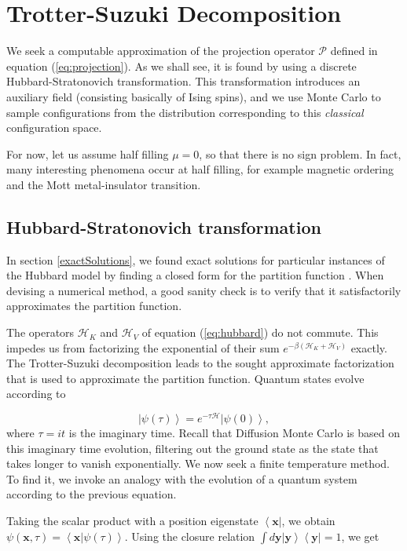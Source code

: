 \section{Trotter-Suzuki Decomposition}
\label{subsec:trotter}

We seek a computable approximation of the projection operator $\mathcal{P}$ defined in equation (\ref{eq:projection}). As we shall see, it is found by using a discrete Hubbard-Stratonovich transformation. This transformation introduces an auxiliary field (consisting basically of Ising spins), and we use Monte Carlo to sample configurations from the distribution corresponding to this \emph{classical} configuration space.

For now, let us assume half filling $\mu = 0$, so that there is no sign problem. In fact, many interesting phenomena occur at half filling, for example magnetic ordering and the Mott metal-insulator transition.

\subsection{Hubbard-Stratonovich transformation}

In section \ref{exactSolutions}, we found exact solutions for particular instances of the Hubbard model by finding a closed form for the partition function \cite{hou_numerical_2009}. When devising a numerical method, a good sanity check is to verify that it satisfactorily approximates the partition function.

The operators $\mathcal{H}_K$ and $\mathcal{H}_V$ of equation (\ref{eq:hubbard}) do not commute. This impedes us from factorizing the exponential of their sum $e^{-\beta (\mathcal{H}_K + \mathcal{H}_V)}$ exactly. The Trotter-Suzuki decomposition leads to the sought approximate factorization that is used to approximate the partition function. Quantum states evolve according to

\begin{equation}
\left| \psi (\tau) \right\rangle = e^{-\tau \mathcal{H} } \left| \psi (0) \right\rangle ,
\end{equation}
where $\tau = it$ is the imaginary time. Recall that Diffusion Monte Carlo is based on this imaginary time evolution, filtering out the ground state as the state that takes longer to vanish exponentially. We now seek a finite temperature method. To find it, we invoke an analogy with the evolution of a quantum system according to the previous equation.

Taking the scalar product with a position eigenstate $ \left\langle \bm x \right|$, we obtain $\psi (\bm x, \tau) = \left\langle \bm x | \psi (\tau) \right\rangle$. Using the closure relation $\int d\bm y \left| \bm y \right\rangle  \left\langle \bm y \right| = 1$, we get

